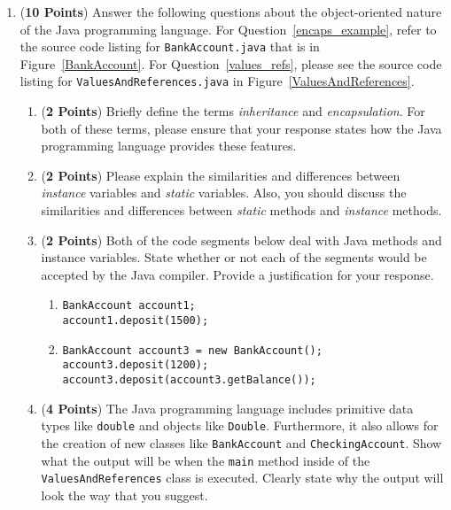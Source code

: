 \documentclass[12pt]{article}
\begin{document}
\begin{enumerate}
  
\item ({\bf 10 Points}) Answer the following questions about the
  object-oriented nature of the Java programming language.  For
  Question~\ref{encaps_example}, refer to the source code listing for
  {\tt BankAccount.java} that is in Figure~\ref{BankAccount}. For
  Question~\ref{values_refs}, please see the source code listing for
  {\tt ValuesAndReferences.java} in Figure~\ref{ValuesAndReferences}.

\begin{enumerate}

\item ({\bf 2 Points}) Briefly define the terms {\em inheritance} and
  {\em encapsulation}. For both of these terms, please ensure that
  your response states how the Java programming language provides
  these features.

\item \label{ctor_example} ({\bf 2 Points}) Please explain the
  similarities and differences between {\em instance} variables and
  {\em static} variables.  Also, you should discuss the similarities
  and differences between {\em static} methods and {\em instance}
  methods.

\item \label{encaps_example} ({\bf 2 Points}) Both of the code
segments below deal with Java methods and instance variables. State
whether or not each of the segments would be accepted by the Java
compiler.  Provide a justification for your response.

\begin{enumerate}

\item {\tt BankAccount account1;}\\
  {\tt account1.deposit(1500);} 

\item {\tt BankAccount account3 = new BankAccount();} \\
  {\tt account3.deposit(1200);} \\
  {\tt account3.deposit(account3.getBalance());}

\end{enumerate} 

\item \label{values_refs} ({\bf 4 Points}) The Java programming
  language includes primitive data types like {\tt double} and objects
  like {\tt Double}.  Furthermore, it also allows for the creation of
  new classes like {\tt BankAccount} and {\tt CheckingAccount}.  Show
  what the output will be when the {\tt main} method inside of the
  {\tt ValuesAndReferences} class is executed.  Clearly state why the
  output will look the way that you suggest.


\end{enumerate}
\end{enumerate}
\end{document}
